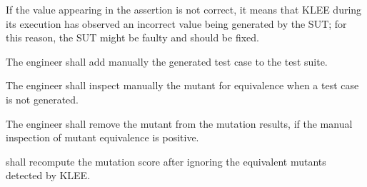 \remark If the value appearing in the assertion is not correct, it means that KLEE during its execution has observed an incorrect value being generated by the SUT; for this reason, the SUT might be faulty and should be fixed.

\RQ{} The engineer shall add manually the generated test case to the test suite.

\RQ{} The engineer shall inspect manually the mutant for equivalence when a test case is not generated.

\RQ{} The engineer shall remove the mutant from the mutation results, if the manual inspection of mutant equivalence is positive.

\RQ{} \FAQAS shall recompute the mutation score after ignoring the equivalent mutants detected by KLEE.

